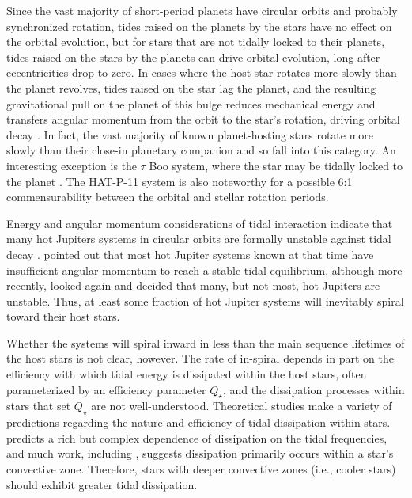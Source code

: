 \documentclass{svjour3}                     %
\providecommand{\DIFadd}[1]{{\protect\color{blue}\uwave{#1}}} %
\providecommand{\DIFaddbegin}{} %
\providecommand{\DIFaddend}{} %
\begin{document}
Since the vast majority of short-period planets have circular orbits and probably synchronized rotation, tides raised on the planets by the stars have no effect on the orbital evolution, but for stars that are not tidally locked to their planets, tides raised on the stars by the planets can drive orbital evolution, long after eccentricities drop to zero. In cases where the host star rotates more slowly than the planet revolves, tides raised on the star lag the planet, and the resulting gravitational pull on the planet of this bulge reduces mechanical energy and transfers angular momentum from the orbit to the star's rotation, driving orbital decay \cite{2008CeMDA.101..171F}. In fact, the vast majority of known planet-hosting stars rotate more slowly than their close-in planetary companion and so fall into this category. An interesting exception is the $\tau$ Boo system, where the star may be tidally locked to the planet \cite{2008A&A...482..691W}. The HAT-P-11 system is also noteworthy for a possible 6:1 commensurability between the orbital and stellar rotation periods\DIFaddbegin \DIFadd{, as discussed in \mbox{%
\cite{2014ApJ...788....1B}}%
}\DIFaddend .

Energy and angular momentum considerations of tidal interaction indicate that many hot Jupiters systems in circular orbits are formally unstable against tidal decay \cite{1973ApJ...180..307C}. \cite{2009ApJ...692L...9L} pointed out that most hot Jupiter systems known at that time have insufficient angular momentum to reach a stable tidal equilibrium, although more recently, \cite{2015MNRAS.446.3676A} looked again and decided that many, but not most, hot Jupiters are unstable. Thus, at least some fraction of hot Jupiter systems will inevitably spiral toward their host stars. 

Whether the systems will spiral inward in less than the main sequence lifetimes of the host stars is not clear, however. The rate of in-spiral depends in part on the efficiency with which tidal energy is dissipated within the host stars, often parameterized by an efficiency parameter $Q_\star$, and the dissipation processes within stars that set $Q_\star$ are not well-understood. Theoretical studies make a variety of predictions regarding the nature and efficiency of tidal dissipation within stars. \cite{2016ApJ...816...18E} predicts a rich but complex dependence of dissipation on the tidal frequencies, and much work, including \cite{2007ApJ...655.1166P}, suggests dissipation primarily occurs within a star's convective zone. Therefore, stars with deeper convective zones (i.e., cooler stars) should exhibit greater tidal dissipation. 
\end{document}
